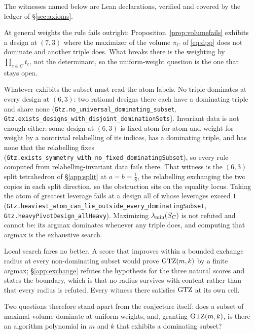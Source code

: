 \begin{enumerate}
The witnesses named below are Lean declarations, verified and covered by
the ledger of \S\ref{sec:axioms}.

At general weights the rule fails outright:
Proposition~\ref{prop:volumefails} exhibits a design at $(7,3)$ where the
maximizer of the volume $\pi_C$ of \eqref{eq:dpp} does not dominate and
another triple does.  What breaks there is the weighting by
$\prod_{c\in C}t_c$, not the determinant, so the uniform-weight question is
the one that stays open.

Whatever exhibits the subset must read the atom labels.  No triple dominates at
every design at $(6,3)$: two rational designs there each have a dominating
triple and share none
(\texttt{Gtz.no\_\allowbreak universal\_\allowbreak dominating\_\allowbreak subset},
\texttt{Gtz.exists\_\allowbreak designs\_\allowbreak with\_\allowbreak disjoint\_\allowbreak domination\allowbreak Sets}).  Invariant data
is not enough either: some design at $(6,3)$ is fixed atom-for-atom and
weight-for-weight by a nontrivial relabelling of its indices, has a dominating
triple, and has none that the relabelling fixes
(\texttt{Gtz.exists\_\allowbreak symmetry\_\allowbreak with\_\allowbreak no\_\allowbreak fixed\_\allowbreak dominating\allowbreak Subset}), so every
rule computed from relabelling-invariant data fails there.  That witness is the
$(6,3)$ split tetrahedron of \S\ref{app:split} at $a=b=\tfrac18$, the
relabelling exchanging the two copies in each split direction, so the
obstruction sits on the equality locus.  Taking the atom of greatest leverage
fails at a design all of whose leverages exceed $1$
(\texttt{Gtz.heaviest\_\allowbreak atom\_\allowbreak can\_\allowbreak lie\_\allowbreak outside\_\allowbreak every\_\allowbreak dominating\allowbreak Subset},
\texttt{Gtz.heavy\allowbreak Pivot\allowbreak Design\_\allowbreak all\allowbreak Heavy}).
Maximizing $\lambda_{\min}(S_{C})$ is not refuted and cannot be: its argmax dominates
whenever any triple does, and computing that argmax is the exhaustive search.

Local search fares no better.  A score that improves within a bounded
exchange radius at every non-dominating subset would prove $\mathrm{GTZ}(m,k)$ by a
finite argmax; \S\ref{app:exchange} refutes the hypothesis for the three
natural scores and states the boundary, which is that no radius survives
with content rather than that every radius is refuted.  Every witness there
satisfies $\mathrm{GTZ}$ at its own cell.

Two questions therefore stand apart from the conjecture itself: does a subset of
maximal volume dominate at uniform weights, and, granting $\mathrm{GTZ}(m,k)$, is there
an algorithm polynomial in $m$ and $k$ that exhibits a dominating subset?

\end{enumerate}
